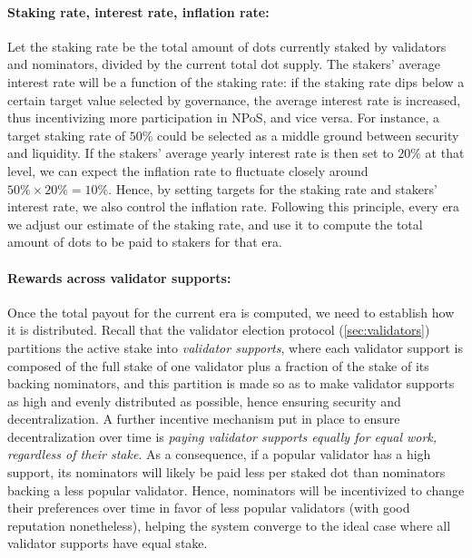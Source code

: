 \paragraph{Staking rate, interest rate, inflation rate:} Let the staking rate be the total amount of dots 
currently staked by validators and nominators, divided by the current total dot supply. 
The stakers' average interest rate will be a function of the staking rate: 
if the staking rate dips below a certain target value selected by governance, 
the average interest rate is increased, thus incentivizing more participation in NPoS, and vice versa. 
For instance, a target staking rate of $50\%$ could be selected as a middle ground between security and liquidity. 
If the stakers' average yearly interest rate is then set to $20\%$ at that level, 
we can expect the inflation rate to fluctuate closely around $50\%\times 20\% = 10\%$. 
Hence, by setting targets for the staking rate and stakers' interest rate, we also control the inflation rate. 
Following this principle, every era we adjust our estimate of the staking rate, 
and use it to compute the total amount of dots to be paid to stakers for that era.

\paragraph{Rewards across validator supports:} 
Once the total payout for the current era is computed, we need to establish how it is distributed.
Recall that the validator election protocol (\autoref{sec:validators}) partitions the active stake into 
\emph{validator supports}, where each validator support is composed of the full stake of one validator 
plus a fraction of the stake of its backing nominators, and this partition is made so as to make validator supports 
as high and evenly distributed as possible, hence ensuring security and decentralization. 
A further incentive mechanism put in place to ensure decentralization over time 
is \emph{paying validator supports equally for equal work, regardless of their stake}. 
As a consequence, if a popular validator has a high support, its nominators will likely be paid less per staked dot 
than nominators backing a less popular validator. Hence, nominators will be incentivized to change their preferences 
over time in favor of less popular validators (with good reputation nonetheless), helping the system converge to the ideal case where all validator supports have equal stake.

